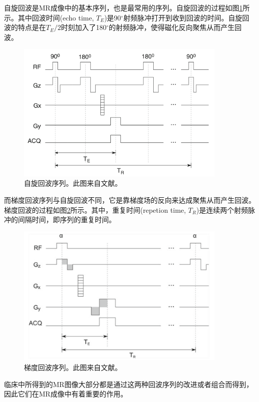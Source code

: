 自旋回波是MR成像中的基本序列，也是最常用的序列。自旋回波的过程如图\ref{fig:se}所示。其中回波时间(echo time, $T_E$)是90$^\circ$射频脉冲打开到收到回波的时间。自旋回波的特点是在$T_E/2$时刻加入了180$^\circ$的射频脉冲，使得磁化反向聚焦从而产生回波。
\begin{figure}[htbp]
\centerline{\includegraphics[width=0.9\textwidth]{img/intro/se.png}}
\caption{自旋回波序列。此图来自文献\cite{haidekker2013medical}。}
\label{fig:se}
\end{figure}
而梯度回波序列与自旋回波不同，它是靠梯度场的反向来达成聚焦从而产生回波。梯度回波的过程如图\ref{fig:ge}所示。其中，重复时间(repetion time, $T_R$)是连续两个射频脉冲的间隔时间，即序列的重复时间。
\begin{figure}[htbp]
\centerline{\includegraphics[width=0.9\textwidth]{img/intro/ge.png}}
\caption{梯度回波序列。此图来自文献\cite{haidekker2013medical}。}
\label{fig:ge}
\end{figure}
临床中所得到的MR图像大部分都是通过这两种回波序列的改进或者组合而得到，因此它们在MR成像中有着重要的作用。

